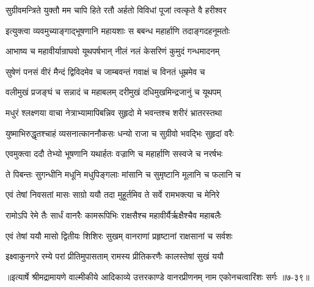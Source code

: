 \twolineshloka
{सुग्रीवमन्त्रिते युक्तौ मम चापि हिते रतौ}
{अर्हतो विविधां पूजां त्वत्कृते वै हरीश्वर} %

\twolineshloka
{इत्युक्त्वा व्यवमुच्याङ्गाद्भूषणानि महायशाः}
{स बबन्ध महार्हाणि तदाङ्गदहनूमतोः} %

\twolineshloka
{आभाष्य च महावीर्यान्राघवो यूथपर्षभान्}
{नीलं नलं केसरिणं कुमुदं गन्धमादनम्} %

\twolineshloka
{सुषेणं पनसं वीरं मैन्दं द्विविदमेव च}
{जाम्बवन्तं गवाक्षं च विनतं धूम्रमेव च} %

\twolineshloka
{वलीमुखं प्रजङ्घं च सन्नादं च महाबलम्}
{दरीमुखं दधिमुखमिन्द्रजानुं च यूथपम्} %

\twolineshloka
{मधुरं श्लक्ष्णया वाचा नेत्राभ्यामापिबन्निव}
{सुहृदो मे भवन्तश्च शरीरं भ्रातरस्तथा} %

\twolineshloka
{युष्माभिरुद्धृतश्चाहं व्यसनात्काननौकसः}
{धन्यो राजा च सुग्रीवो भवद्भिः सुहृदां वरैः} %

\twolineshloka
{एवमुक्त्वा ददौ तेभ्यो भूषणानि यथार्हतः}
{वज्राणि च महार्हाणि सस्वजे च नरर्षभः} %

\twolineshloka
{ते पिबन्तः सुगन्धीनि मधूनि मधुपिङ्गलाः}
{मांसानि च सुमृष्टानि मूलानि च फलानि च} %

\twolineshloka
{एवं तेषां निवसतां मासः साग्रो ययौ तदा}
{मुहूर्तमिव ते सर्वे रामभक्त्या च मेनिरे} %

\twolineshloka
{रामोऽपि रेमे तैः सार्धं वानरैः कामरूपिभिः}
{राक्षसैश्च महावीर्यैर्ऋक्षैश्चैव महाबलैः} %

\twolineshloka
{एवं तेषां ययौ मासो द्वितीयः शिशिरः सुखम्}
{वानराणां प्रहृष्टानां राक्षसानां च सर्वशः} %

\twolineshloka
{इक्ष्वाकुनगरे रम्ये परां प्रीतिमुपासताम्}
{रामस्य प्रीतिकरणैः कालस्तेषां सुखं ययौ} %


॥इत्यार्षे श्रीमद्रामायणे वाल्मीकीये आदिकाव्ये उत्तरकाण्डे वानरप्रीणनम् नाम एकोनचत्वारिंशः सर्गः ॥७-३९॥
